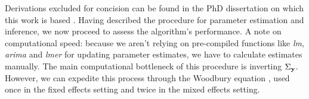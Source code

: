 \medskip




Derivations excluded for concision can be found in the PhD dissertation on which this work
is based \cite{Argentino2026}. Having described the procedure for parameter estimation and
inference, we now proceed to assess the algorithm's performance. A note on computational speed:
because we aren't relying on pre-compiled functions like \emph{lm}, \emph{arima} and 
\emph{lmer} for updating parameter estimates, we have to calculate estimates manually.
The main computational bottleneck of this procedure is inverting $\Sigma_{\mathbf{y}}$. However,
we can expedite this process through the Woodbury equation \cite{woodbury1950}, used once in
the fixed effects setting and twice in the mixed effects setting.


